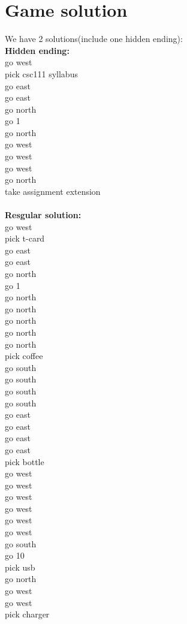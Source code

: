 \documentclass[11pt]{article}
\begin{document}
\section*{Game solution}
We have 2 solutions(include one hidden ending):\\
\textbf{Hidden ending:}\\
go west\\
pick csc111 syllabus\\
go east\\
go east\\
go north\\
go 1\\
go north\\
go west\\
go west\\
go west\\
go north\\
take assignment extension\\ \\
\textbf{Resgular solution:}\\
go west\\
pick t-card\\
go east\\
go east\\
go north\\
go 1\\
go north\\
go north\\
go north\\
go north\\
go north\\
pick coffee\\
go south\\
go south\\
go south\\
go south\\
go east\\
go east\\
go east\\
go east\\
pick bottle\\
go west\\
go west\\
go west\\
go west\\
go west\\
go west\\
go south\\
go 10\\
pick usb\\
go north\\
go west\\
go west\\
pick charger\\
\end{document}
